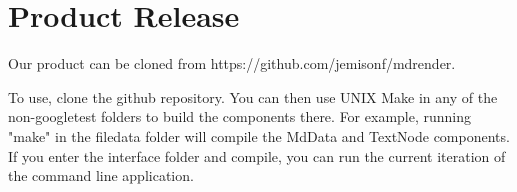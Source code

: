 \section{Product Release}

Our product can be cloned from https://github.com/jemisonf/mdrender.

To use, clone the github repository. You can then use UNIX Make in any of the non-googletest folders to build the components there. For example, running "make" in the filedata folder will compile the MdData and TextNode components. If you enter the interface folder and compile, you can run the current iteration of the command line application. 
